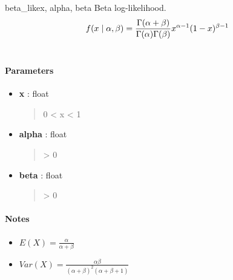 \hypertarget{pymc.distributions.beta_like}{}\begin{funcdesc}{beta\_like}{x, alpha, beta}
Beta log-likelihood.
\begin{gather}
\begin{split}f(x \mid \alpha, \beta) = \frac{\Gamma(\alpha + \beta)}{\Gamma(\alpha) \Gamma(\beta)} x^{\alpha - 1} (1 - x)^{\beta - 1}\end{split}\notag\\\begin{split}\end{split}\notag
\end{gather}
\paragraph{Parameters}
\begin{itemize}
\item[] \textbf{x} : float
\begin{quote}

0 \textless{} x \textless{} 1
\end{quote}

\item[] \textbf{alpha} : float
\begin{quote}

\textgreater{} 0
\end{quote}

\item[] \textbf{beta} : float
\begin{quote}

\textgreater{} 0
\end{quote}
\end{itemize}
\paragraph{Notes}
\begin{itemize}
\item {} 
$E(X)=\frac{\alpha}{\alpha+\beta}$

\item {} 
$Var(X)=\frac{\alpha \beta}{(\alpha+\beta)^2(\alpha+\beta+1)}$

\end{itemize}

\end{funcdesc}

